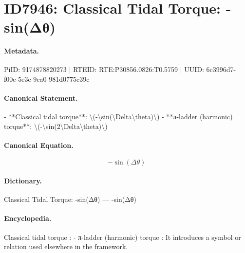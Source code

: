 \section*{ID7946: Classical Tidal Torque: -sin(Δθ)}
\paragraph{Metadata.}
PiID: 9174878820273 | RTEID: RTE:P30856.0826:T0.5759 | UUID: 6c3996d7-f00e-5e3e-9ca0-981d0775c39c

\paragraph{Canonical Statement.}
- **Classical tidal torque**: \textbackslash{}(-\textbackslash{}sin(\textbackslash{}Delta\textbackslash{}theta)\textbackslash{}) - **π-ladder (harmonic) torque**: \textbackslash{}(-\textbackslash{}sin(2\textbackslash{}Delta\textbackslash{}theta)\textbackslash{})

\paragraph{Canonical Equation.}
\[
-\sin(\Delta\theta)
\]

\paragraph{Dictionary.}
Classical Tidal Torque: -sin(Δθ) — -sin(Δθ)

\paragraph{Encyclopedia.}
Classical tidal torque : - π-ladder (harmonic) torque : It introduces a symbol or relation used elsewhere in the framework.

